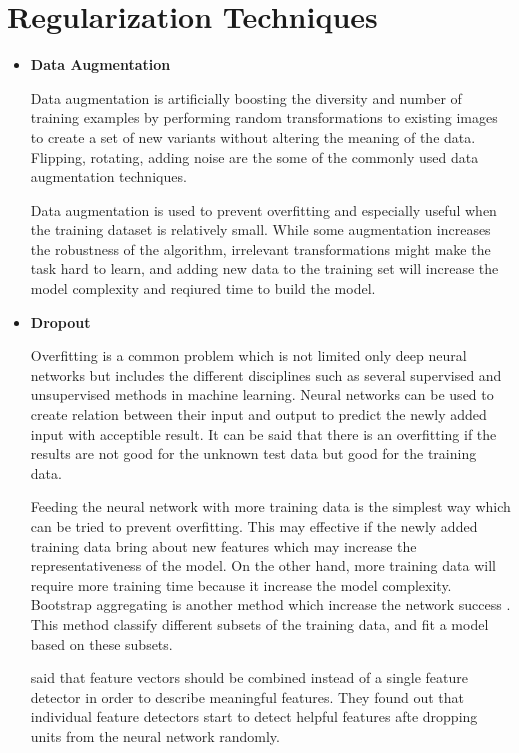 \section{Regularization Techniques}

\begin{itemize}

	\item \textbf{Data Augmentation}

        Data augmentation is artificially boosting the diversity and number of training examples by performing random transformations to existing images to create a set of new variants without altering the meaning of the data.
        Flipping, rotating, adding noise are the some of the commonly used data augmentation techniques.

        Data augmentation is used to prevent overfitting and especially useful when the training dataset is relatively small.
        While some augmentation increases the robustness of the algorithm, irrelevant transformations might make the task hard to learn, and adding new data to the training set will increase the model complexity and reqiured time to build the model.

	\item \textbf{Dropout}

        Overfitting is a common problem which is not limited only deep neural networks but includes the different disciplines such as several supervised and unsupervised methods in machine learning.
        Neural networks can be used to create relation between their input and output to predict the newly added input with acceptible result.
        It can be said that there is an overfitting if the results are not good for the unknown test data but good for the training data.

        Feeding the neural network with more training data is the simplest way which can be tried to prevent overfitting.
        This may effective if the newly added training data bring about new features which may increase the representativeness of the model. On the other hand, more training data will require more training time because it increase the model complexity.
        Bootstrap aggregating is another method which increase the network success \cite{breiman1996bagging}.
        This method classify different subsets of the training data, and fit a model based on these subsets.

        \citet{srivastava2014dropout} said that feature vectors should be combined instead of a single feature detector in order to describe meaningful features.
        They found out that  individual feature detectors start to detect helpful features afte dropping units from the neural network randomly.


\end{itemize}
